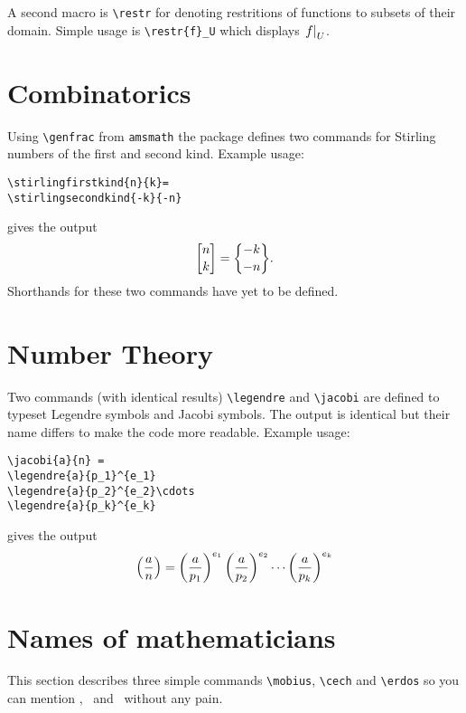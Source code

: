 \documentclass[12pt,a4paper]{article}
\begin{document}
A second macro is \verb|\restr| for denoting restritions of functions to subsets of their domain.
Simple usage is \verb|\restr{f}_U| which displays $\left.f\right|_U$.



\section{Combinatorics}

Using \verb|\genfrac| from \verb|amsmath| the package defines two commands for Stirling numbers of the first and second kind.
Example usage:
\begin{verbatim}
\stirlingfirstkind{n}{k}=
\stirlingsecondkind{-k}{-n}
\end{verbatim}
gives the output
\[
\stirlingfirstkind{n}{k}=
\stirlingsecondkind{-k}{-n}.
\]
Shorthands for these two commands have yet to be defined.

\section{Number Theory}
Two commands (with identical results) \verb|\legendre| and \verb|\jacobi| are defined to typeset Legendre symbols and Jacobi symbols.
The output is identical but their name differs to make the code more readable.
Example usage:
\begin{verbatim}
\jacobi{a}{n} =
\legendre{a}{p_1}^{e_1}
\legendre{a}{p_2}^{e_2}\cdots 
\legendre{a}{p_k}^{e_k}
\end{verbatim}
gives the output
\[
\left(\frac{a}{n}\right) =
\left(\frac{a}{p_1}\right)^{e_1}
\left(\frac{a}{p_2}\right)^{e_2}\cdots 
\left(\frac{a}{p_k}\right)^{e_k}
\]

\section{Names of mathematicians}
This section describes three simple commands \verb|\mobius|, \verb|\cech| and \verb|\erdos| so you can mention \mobius, \cech\ and \erdos\ without any pain.
\end{document}
